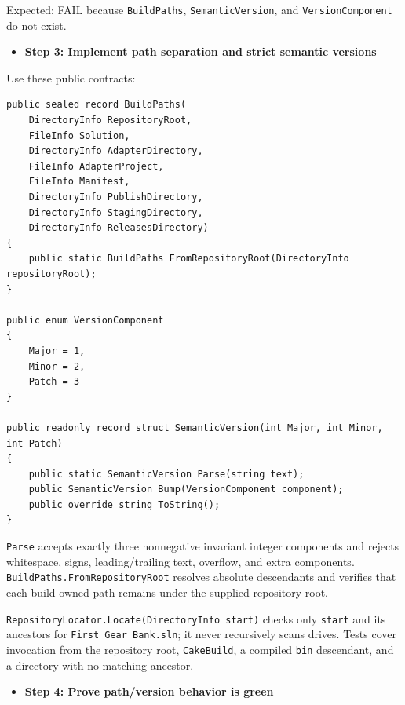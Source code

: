 \documentclass[
  10pt,
  letterpaper,
]{article}
\newcommand{\passthrough}[1]{#1}
\providecommand{\tightlist}{%
  \setlength{\itemsep}{0pt}\setlength{\parskip}{0pt}}
\begin{document}
Expected: FAIL because \passthrough{\lstinline!BuildPaths!},
\passthrough{\lstinline!SemanticVersion!}, and
\passthrough{\lstinline!VersionComponent!} do not exist.

\begin{itemize}
\tightlist
\item[$\square$]
  \textbf{Step 3: Implement path separation and strict semantic
  versions}
\end{itemize}

Use these public contracts:

\begin{lstlisting}
public sealed record BuildPaths(
    DirectoryInfo RepositoryRoot,
    FileInfo Solution,
    DirectoryInfo AdapterDirectory,
    FileInfo AdapterProject,
    FileInfo Manifest,
    DirectoryInfo PublishDirectory,
    DirectoryInfo StagingDirectory,
    DirectoryInfo ReleasesDirectory)
{
    public static BuildPaths FromRepositoryRoot(DirectoryInfo repositoryRoot);
}

public enum VersionComponent
{
    Major = 1,
    Minor = 2,
    Patch = 3
}

public readonly record struct SemanticVersion(int Major, int Minor, int Patch)
{
    public static SemanticVersion Parse(string text);
    public SemanticVersion Bump(VersionComponent component);
    public override string ToString();
}
\end{lstlisting}

\passthrough{\lstinline!Parse!} accepts exactly three nonnegative
invariant integer components and rejects whitespace, signs,
leading/trailing text, overflow, and extra components.
\texttt{BuildPaths.}\allowbreak{}\texttt{FromRepositoryRoot} resolves
absolute descendants and verifies that each build-owned path remains
under the supplied repository root.

\texttt{RepositoryLocator.}\allowbreak{}\texttt{Locate(}\allowbreak{}\texttt{DirectoryInfo\ }\allowbreak{}\texttt{start)}\allowbreak{}
checks only \passthrough{\lstinline!start!} and its ancestors for
\passthrough{\lstinline!First Gear Bank.sln!}; it never recursively
scans drives. Tests cover invocation from the repository root,
\passthrough{\lstinline!CakeBuild!}, a compiled
\passthrough{\lstinline!bin!} descendant, and a directory with no
matching ancestor.

\begin{itemize}
\tightlist
\item[$\square$]
  \textbf{Step 4: Prove path/version behavior is green}
\end{itemize}
\end{document}
